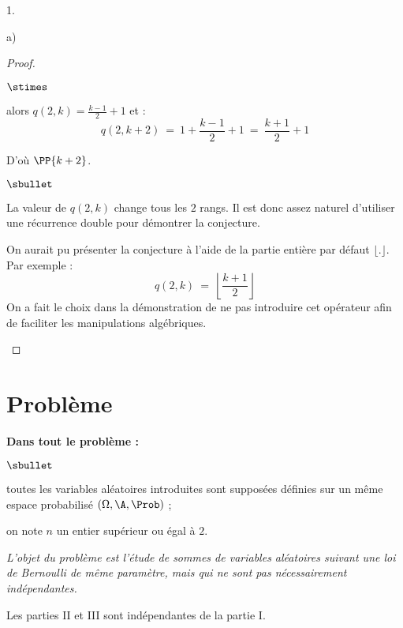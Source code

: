 \begin{noliste}{1.}
\begin{noliste}{a)}
\begin{proof}
\begin{noliste}{\fitem}
\begin{noliste}{$\stimes$}
        \item {} alors $q(2, k) = \frac{k-1}{2}
          + 1$ et :
          \[
          q(2, k+2) \ = \ 1 + \dfrac{k-1}{2} + 1 \ = \ \dfrac{k+1}{2}
          + 1
          \]
        \end{noliste}
        D'où $\PP{k+2}$.
      \end{noliste}
      \begin{remark}
        \begin{noliste}{$\sbullet$}
        \item La valeur de $q(2, k)$ change tous les $2$ rangs. Il est
          donc assez naturel d'utiliser une récurrence double pour
          démontrer la conjecture.

        \item On aurait pu présenter la conjecture à l'aide de la
          partie entière par défaut $\lfloor . \rfloor$.\\
          Par exemple :
          \[
          q(2, k) \ = \ \left\lfloor \dfrac{k+1}{2} \right\rfloor
          \]
          On a fait le choix dans la démonstration de ne pas
          introduire cet opérateur afin de faciliter les manipulations
          algébriques.
        \end{noliste}
      \end{remark}
    \end{proof}    
  \end{noliste}
\end{noliste}



\newpage


\section*{Problème}

\noindent
{\bfseries Dans tout le problème :}
\begin{noliste}{$\sbullet$}
  \item toutes les variables aléatoires introduites sont 
  supposées définies sur un même espace probabilisé $(\Omega, \A, 
  \Prob)$ ;
  
  \item on note $n$ un entier supérieur ou égal à $2$.
\end{noliste}
{\it L'objet du problème est l'étude de sommes de variables 
aléatoires suivant une loi de Bernoulli de même paramètre, mais qui ne 
sont pas nécessairement indépendantes.

\noindent
Les parties II et III sont indépendantes de la partie I.}


